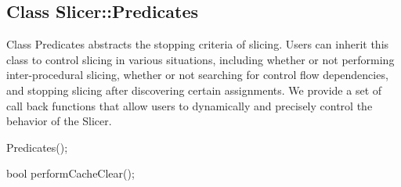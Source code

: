 
\subsection{Class Slicer::Predicates}
\label{sec:slicing}


Class Predicates abstracts the stopping criteria of slicing. Users can inherit
this class to control slicing in various situations, including whether or not
performing inter-procedural slicing, whether or not searching for control flow
dependencies, and stopping slicing after discovering certain assignments. We
provide a set of call back functions that allow users to dynamically and precisely control the
behavior of the Slicer.

\begin{apient}
Predicates(); 
\end{apient}

\begin{apient}
bool performCacheClear(); 
\end{apient}

